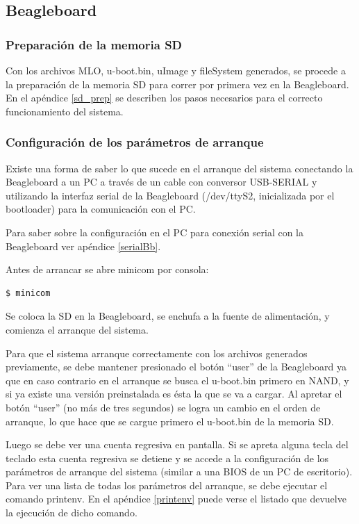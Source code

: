 \subsection{Beagleboard}

\subsubsection{Preparación de la memoria SD}

Con los archivos MLO, u-boot.bin, uImage y fileSystem generados, se procede a la preparación de la memoria SD para correr por primera vez en la Beagleboard. En el apéndice \ref{sd_prep} se describen los pasos necesarios para el correcto funcionamiento del sistema.


\subsubsection{Configuración de los parámetros de arranque}

Existe una forma de saber lo que sucede en el arranque del sistema conectando la Beagleboard a un PC a través de un cable con conversor USB-SERIAL y utilizando la interfaz serial de la Beagleboard (/dev/ttyS2, inicializada por el bootloader) para la comunicación con el PC.

\bigskip
Para saber sobre la configuración en el PC para conexión serial con la Beagleboard ver apéndice \ref{serialBb}.

\bigskip
{}

\bigskip
Antes de arrancar se abre minicom por consola: 

\bigskip
\begin{verbatim}
$ minicom
\end{verbatim}

Se coloca la SD en la Beagleboard, se enchufa a la fuente de alimentación, y comienza el arranque del sistema. 

Para que el sistema arranque correctamente con los archivos generados previamente, se debe mantener presionado el botón “user” de la Beagleboard ya que en caso contrario en el arranque se busca el u-boot.bin primero en NAND, y si ya existe una versión preinstalada es ésta la que se va a cargar. Al apretar el botón “user” (no más de tres segundos) se logra un cambio en el orden de arranque, lo que hace que se cargue primero el u-boot.bin de la memoria SD.

Luego se debe ver una cuenta regresiva en pantalla. 
Si se apreta alguna tecla del teclado esta cuenta regresiva se detiene y se accede a la configuración de los parámetros de arranque del sistema (similar a una BIOS de un PC de escritorio). Para ver una lista de todas los parámetros del arranque, se debe ejecutar el comando printenv. En el apéndice \ref{printenv} puede verse el listado que devuelve la ejecución de dicho comando.

